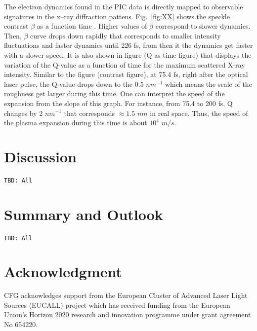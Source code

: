 \documentclass[preprint, 12pt]{elsarticle}
\begin{document}
{The electron dynamics found in the PIC data is directly mapped to observable
signatures in the x--ray diffraction pattens. Fig.~\ref{fig:XX}
shows the speckle contrast $\beta$ as a function time .
Higher values of $\beta$ correspond to slower dynamics.
Then, $\beta$ curve drops down rapidly that corresponds to
smaller intensity fluctuations and faster dynamics until 226 fs, from then it
the dynamics get faster with a slower speed. It is also shown in figure (Q as
time figure) that displays the variation of the Q-value as a function of time
for the maximum scattered X-ray intensity. Similar to the figure (contrast
figure), at 75.4 fs, right after the optical laser pulse, the Q-value drops down
to the 0.5 $nm^{-1}$ which means the scale of the roughness get larger during
this time. One can interpret the speed of the expansion from the slope of this
graph. For instance, from 75.4 to 200 fs, Q changes by 2 $nm^{-1}$ that
corresponds $\approx 1.5$ $nm$ in real space. Thus, the speed of the plasma
expansion during this time is about $10^{4}$ $m/s$.
}
%
\section{Discussion}
\begin{verbatim}
TBD: All
\end{verbatim}
%
\lipsum[3]
\section{Summary and Outlook}
\begin{verbatim}
TBD: All
\end{verbatim}
%
\lipsum[4]
\section{Acknowledgment}
CFG acknowledges support from the European Cluster of Advanced Laser Light
Sources (EUCALL) project which has received funding from the European Union’s
Horizon 2020 research and innovation programme under grant agreement No 654220.





%
\end{document}
